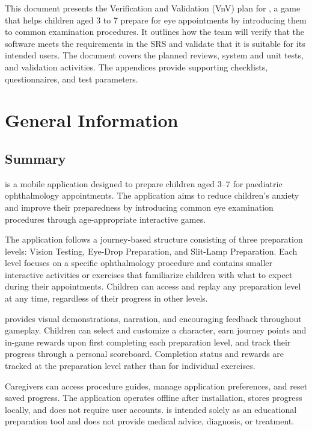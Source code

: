 \documentclass[10pt,titlepage]{article}
\begin{document}
This document presents the Verification and Validation (VnV) plan for
\progname{}, a game that helps children aged 3 to 7 prepare for eye
appointments by introducing them to common examination procedures. It outlines
how the team will verify that the software meets the requirements in the SRS
and validate that it is suitable for its intended users. The document covers
the planned reviews, system and unit tests, and validation activities. The
appendices provide supporting checklists, questionnaires, and test parameters.

\section{General Information}\label{sec:section2}

\subsection{Summary}

\progname{} is a mobile application designed to prepare children aged 3--7
for paediatric ophthalmology appointments. The application aims to reduce
children's anxiety and improve their preparedness by introducing common
eye examination procedures through age-appropriate interactive games.

The application follows a journey-based structure consisting of three
preparation levels: Vision Testing, Eye-Drop Preparation, and Slit-Lamp
Preparation. Each level focuses on a specific ophthalmology procedure
and contains smaller interactive activities or exercises that familiarize
children with what to expect during their appointments. Children can
access and replay any preparation level at any time, regardless of their
progress in other levels.

\progname{} provides visual demonstrations, narration, and encouraging
feedback throughout gameplay. Children can select and customize a
character, earn journey points and in-game rewards upon first completing
each preparation level, and track their progress through a personal
scoreboard. Completion status and rewards are tracked at the preparation
level rather than for individual exercises.

Caregivers can access procedure guides, manage application preferences,
and reset saved progress. The application operates offline after
installation, stores progress locally, and does not require user
accounts. \progname{} is intended solely as an educational preparation
tool and does not provide medical advice, diagnosis, or treatment.
\end{document}
